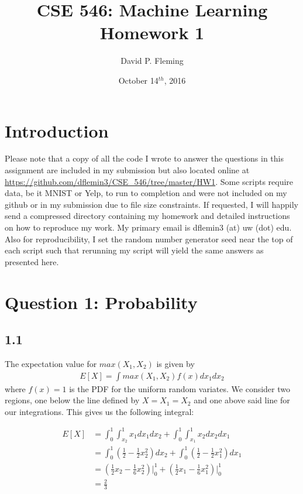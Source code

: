 \documentclass[12pt]{amsart}
\title{CSE 546: Machine Learning Homework 1}
\author{David P. Fleming}
\date{October 14$^{th}$, 2016}
\begin{document}
\maketitle
\tableofcontents

\section*{Introduction}

Please note that a copy of all the code I wrote to answer the questions in this assignment are included in my submission but also located online at \url{https://github.com/dflemin3/CSE_546/tree/master/HW1}.  Some scripts require data, be it MNIST or Yelp, to run to completion and were not included on my github or in my submission due to file size constraints.  If requested, I will happily send a compressed directory containing my homework and detailed instructions on how to reproduce my work.  My primary email is dflemin3 (at) uw (dot) edu.  Also for reproducibility, I set the random number generator seed near the top of each script such that rerunning my script will yield the same answers as presented here.


\section*{Question 1: Probability}

\subsection*{1.1}
The expectation value for $max(X_1, X_2)$ is given by
\begin{align}
E[X] = \int max(X_1,X_2) f(x) dx_1 dx_2
\end{align}
where $f(x) = 1$ is the PDF for the uniform random variates.  We consider two regions, one below the line defined by $X = X_1 = X_2$ and one above said line for our integrations.  This gives us the following integral:

\begin{equation} \label{eqn:1.1}
\begin{split}
E[X] & = \int_0^1 \int_{x_2}^1 x_1 dx_1 dx_2 + \int_0^1 \int_{x_1}^1 x_2 dx_2 dx_1 \\
& = \int_0^1 (\frac{1}{2} - \frac{1}{2}x_2^2) dx_2 + \int_0^1 (\frac{1}{2} - \frac{1}{2}x_1^2) dx_1 \\
& = (\frac{1}{2}x_2 - \frac{1}{6}x_2^2) \vert_0^1 + (\frac{1}{2}x_1 - \frac{1}{6}x_1^2) \vert_0^1 \\
& = \frac{2}{3}
\end{split}
\end{equation}
\end{document}
